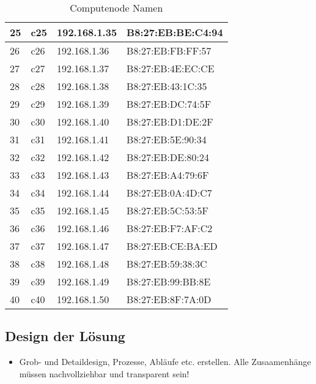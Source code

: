 \begin{table}[H]
\begin{tabular}{p{1cm}p{2cm}p{6cm}p{6cm}}
25 & c25 & 192.168.1.35 & B8:27:EB:BE:C4:94\\\hline
26 & c26 & 192.168.1.36 & B8:27:EB:FB:FF:57\\\hline
27 & c27 & 192.168.1.37 & B8:27:EB:4E:EC:CE\\\hline
28 & c28 & 192.168.1.38 & B8:27:EB:43:1C:35\\\hline
29 & c29 & 192.168.1.39 & B8:27:EB:DC:74:5F\\\hline
30 & c30 & 192.168.1.40 & B8:27:EB:D1:DE:2F\\\hline
31 & c31 & 192.168.1.41 & B8:27:EB:5E:90:34\\\hline
32 & c32 & 192.168.1.42 & B8:27:EB:DE:80:24\\\hline
33 & c33 & 192.168.1.43 & B8:27:EB:A4:79:6F\\\hline
34 & c34 & 192.168.1.44 & B8:27:EB:0A:4D:C7\\\hline
35 & c35 & 192.168.1.45 & B8:27:EB:5C:53:5F\\\hline
36 & c36 & 192.168.1.46 & B8:27:EB:F7:AF:C2\\\hline
37 & c37 & 192.168.1.47 & B8:27:EB:CE:BA:ED\\\hline
38 & c38 & 192.168.1.48 & B8:27:EB:59:38:3C\\\hline
39 & c39 & 192.168.1.49 & B8:27:EB:99:BB:8E\\\hline
40 & c40 & 192.168.1.50 & B8:27:EB:8F:7A:0D\\\hline
\end{tabular}
\caption{Computenode Namen}
\end{table}


\subsection{Design der Lösung}
\begin{itemize}
	\item Grob- und Detaildesign, Prozesse, Abläufe etc. erstellen. Alle Zusaamenhänge müssen nachvollziehbar und transparent sein!
\end{itemize}


